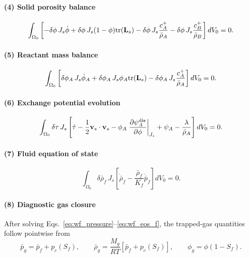 \documentclass[11pt]{article}
\begin{document}
\paragraph{(4) Solid porosity balance}
\begin{equation}
\int_{\Omega_0}\left[-\delta\phi\,J_s\dot\phi + \delta\phi\,J_s(1-\phi)\mathrm{tr}(\mathbf{L}_s)-\delta\phi\,J_s\frac{c_A^+}{\bar\rho_A}-\delta\phi\,J_s\frac{c_B^+}{\bar\rho_B}\right]dV_0=0.
\label{eq:wf_solid}
\end{equation}

\paragraph{(5) Reactant mass balance}
\begin{equation}
\int_{\Omega_0}\left[\delta\phi_A\,J_s\dot\phi_A+\delta\phi_A\,J_s\phi_A\mathrm{tr}(\mathbf{L}_s)-\delta\phi_A\,J_s\frac{c_A^+}{\bar\rho_A}\right]dV_0=0.
\label{eq:wf_reactant}
\end{equation}

\paragraph{(6) Exchange potential evolution}
\begin{equation}
\int_{\Omega_0}\delta\tau\,J_s\left[\dot\tau-\frac12\mathbf{v}_s\cdot\mathbf{v}_s-\phi_A\left.\frac{\partial\psi_A^{\mathrm{dis}}}{\partial\phi}\right|_{J_s}+\psi_A-\frac{\lambda}{\bar\rho_A}\right]dV_0=0.
\label{eq:wf_tau}
\end{equation}

\paragraph{(7) Fluid equation of state}
\begin{equation}
\int_{\Omega_0}\delta\bar\rho_f\,J_s\left[\dot{\bar\rho}_f-\frac{\bar\rho_f}{K_f}\dot{\bar p}_f\right]dV_0=0.
\label{eq:wf_eos_f}
\end{equation}

\paragraph{(8) Diagnostic gas closure}
After solving Eqs.~\eqref{eq:wf_pressure}--\eqref{eq:wf_eos_f}, the trapped-gas quantities follow pointwise from
\begin{equation}
  \bar p_g = \bar p_f + p_c(S_f), \qquad \bar\rho_g = \frac{M_g}{RT}\left[\bar p_f + p_c(S_f)\right], \qquad \phi_g = \phi(1-S_f).
\label{eq:diag_pc}
\end{equation}
\end{document}
